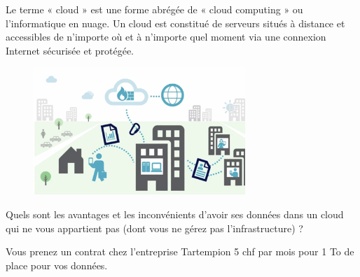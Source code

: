 \documentclass[11pt, a4paper]{book}
\begin{document}
\begin{remarques}
Le terme « cloud » est une forme abrégée de « cloud computing » ou l’informatique en nuage. Un cloud est constitué de serveurs situés à distance et accessibles de n’importe où et à n’importe quel moment via une connexion Internet sécurisée et protégée.
\end{remarques}

\begin{figure}[ht!]
\centering
\includegraphics[width=8cm]{images/Business_Network_Solutions_swisscom.png}
\end{figure}

Quels sont les avantages et les inconvénients d’avoir ses données dans un cloud qui ne vous appartient pas (dont vous ne gérez pas l’infrastructure) ?

\begin{example} Vous prenez un contrat chez l’entreprise Tartempion 5 chf par mois pour 1 To de place pour vos données.
\end{example}
\end{document}
